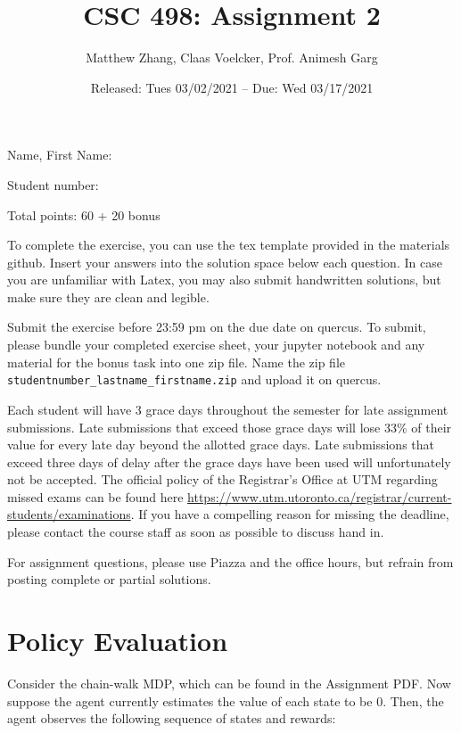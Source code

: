 \documentclass[12pt,
               addpoints,
	       answers
               ]{exam}
\author{Matthew Zhang, Claas Voelcker, Prof. Animesh Garg}
\title{CSC 498: Assignment 2}
\date{Released: Tues 03/02/2021 -- Due: Wed 03/17/2021}
\begin{document}
	\maketitle
	
	Name, First Name: \hrulefill %
	
    Student number: \hrulefill %

    Total points: 60 + 20 bonus
	\vspace{1cm}
	
	To complete the exercise, you can use the tex template provided in the materials github. Insert your answers into the solution space below each question. In case you are unfamiliar with Latex, you may also submit handwritten solutions, but make sure they are clean and legible.

Submit the exercise before 23:59 pm on the due date on quercus. To submit, please bundle your completed exercise sheet, your jupyter notebook and any material for the bonus task into one zip file. Name the zip file \verb"studentnumber_lastname_firstname.zip" and upload it on quercus. 

Each student will have 3 grace days throughout the semester for late assignment submissions. Late submissions that exceed those grace days will lose 33\% of their value for every late day beyond the allotted grace days. Late submissions that exceed three days of delay after the grace days have been used will unfortunately not be accepted. The official policy of the Registrar’s Office at UTM regarding missed exams can be found here \url{https://www.utm.utoronto.ca/registrar/current-students/examinations}. If you have a compelling reason for missing the deadline, please contact the course staff as soon as possible to discuss hand in.

For assignment questions, please use Piazza and the office hours, but refrain from posting complete or partial solutions.

\newpage

\vspace{2cm}

\section{Policy Evaluation}
    Consider the chain-walk MDP, which can be found in the Assignment PDF. Now suppose the agent currently estimates the value of each state to be $0$. Then, the agent observes the following sequence of states and rewards:
    
\end{document}
